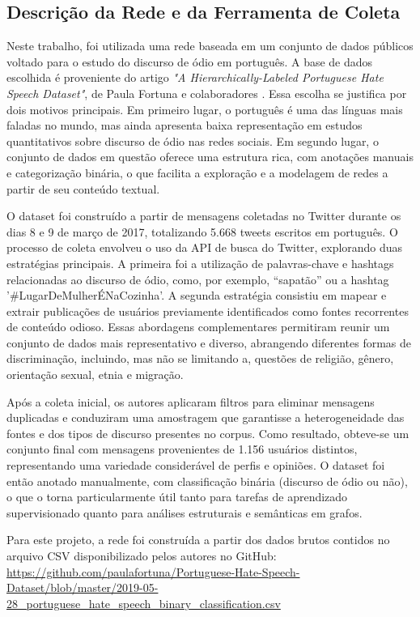 \documentclass[12pt, a4paper]{article}
\begin{document}
\subsection{Descrição da Rede e da Ferramenta de Coleta}
Neste trabalho, foi utilizada uma rede baseada em um conjunto de dados públicos voltado para o estudo do discurso de ódio em português. A base de dados escolhida é proveniente do artigo \textit{"A Hierarchically-Labeled Portuguese Hate Speech Dataset"}, de Paula Fortuna e colaboradores \cite{fortuna2019hierarchically}. Essa escolha se justifica por dois motivos principais. Em primeiro lugar, o português é uma das línguas mais faladas no mundo, mas ainda apresenta baixa representação em estudos quantitativos sobre discurso de ódio nas redes sociais. Em segundo lugar, o conjunto de dados em questão oferece uma estrutura rica, com anotações manuais e categorização binária, o que facilita a exploração e a modelagem de redes a partir de seu conteúdo textual.

O dataset foi construído a partir de mensagens coletadas no Twitter durante os dias 8 e 9 de março de 2017, totalizando 5.668 tweets escritos em português. O processo de coleta envolveu o uso da API de busca do Twitter, explorando duas estratégias principais. A primeira foi a utilização de palavras-chave e hashtags relacionadas ao discurso de ódio, como, por exemplo, “sapatão” ou a hashtag '\#LugarDeMulherÉNaCozinha'. A segunda estratégia consistiu em mapear e extrair publicações de usuários previamente identificados como fontes recorrentes de conteúdo odioso. Essas abordagens complementares permitiram reunir um conjunto de dados mais representativo e diverso, abrangendo diferentes formas de discriminação, incluindo, mas não se limitando a, questões de religião, gênero, orientação sexual, etnia e migração.

Após a coleta inicial, os autores aplicaram filtros para eliminar mensagens duplicadas e conduziram uma amostragem que garantisse a heterogeneidade das fontes e dos tipos de discurso presentes no corpus. Como resultado, obteve-se um conjunto final com mensagens provenientes de 1.156 usuários distintos, representando uma variedade considerável de perfis e opiniões. O dataset foi então anotado manualmente, com classificação binária (discurso de ódio ou não), o que o torna particularmente útil tanto para tarefas de aprendizado supervisionado quanto para análises estruturais e semânticas em grafos.

Para este projeto, a rede foi construída a partir dos dados brutos contidos no arquivo CSV disponibilizado pelos autores no GitHub: \url{https://github.com/paulafortuna/Portuguese-Hate-Speech-Dataset/blob/master/2019-05-28_portuguese_hate_speech_binary_classification.csv}
\end{document}
